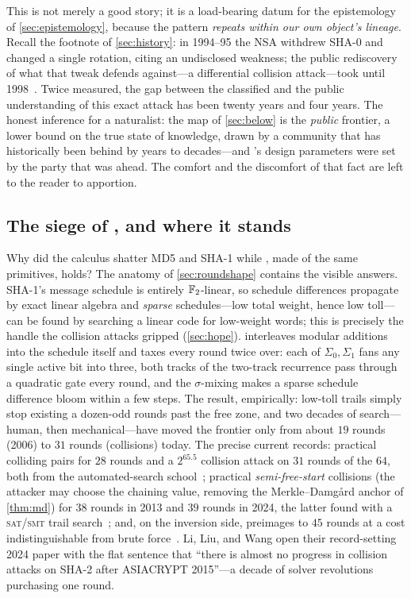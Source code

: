 This is not merely a good story; it is a load-bearing datum for the
epistemology of \cref{sec:epistemology}, because the pattern
\emph{repeats within our own object's lineage}. Recall the footnote of
\cref{sec:history}: in 1994--95 the NSA withdrew SHA-0 and changed a
single rotation, citing an undisclosed weakness; the public rediscovery
of what that tweak defends against---a differential collision
attack---took until 1998~\citep{ChabaudJoux1998}. Twice measured, the
gap between the classified and the public understanding of this exact
attack has been twenty years and four years. The honest inference for a
naturalist: the map of \cref{sec:below} is the \emph{public} frontier,
a lower bound on the true state of knowledge, drawn by a community that
has historically been behind by years to decades---and \SHA{}'s design
parameters were set by the party that was ahead. The comfort and the
discomfort of that fact are left to the reader to apportion.

\subsection{The siege of \SHA{}, and where it stands}\label{sec:siege}

Why did the calculus shatter MD5 and SHA-1 while \SHA{}, made of the
same primitives, holds? The anatomy of \cref{sec:roundshape} contains
the visible answers. SHA-1's message schedule is entirely
$\mathbb{F}_2$-linear, so schedule differences propagate by exact linear
algebra and \emph{sparse} schedules---low total weight, hence low
toll---can be found by searching a linear code for low-weight words;
this is precisely the handle the collision attacks
gripped (\cref{sec:hope}). \SHA{} interleaves modular additions into
the schedule itself and taxes every round twice over: each of
$\Sigma_0, \Sigma_1$ fans any single active bit into three, both tracks
of the two-track recurrence pass through a quadratic gate every round,
and the $\sigma$-mixing makes a sparse schedule difference bloom
within a few steps. The result, empirically: low-toll trails simply
stop existing a dozen-odd rounds past the free zone, and two decades of
search---human, then mechanical---have moved the frontier only from
about $19$ rounds (2006) to $31$ rounds (collisions) today. The precise
current records: practical colliding pairs for $28$ rounds and a
$2^{65.5}$ collision attack on $31$ rounds of the $64$, both from the
automated-search school~\citep{MendelNadSchlaffer2013}; practical
\emph{semi-free-start} collisions (the attacker may choose the chaining
value, removing the Merkle--Damg{\aa}rd anchor of \cref{thm:md}) for
$38$ rounds in 2013 and $39$ rounds in 2024, the latter found with a
\textsc{sat}/\textsc{smt} trail search~\citep{LiLiuWang2024,
AlamgirNejatiBright2024}; and, on the inversion side, preimages to $45$
rounds at a cost indistinguishable from brute
force~\citep{KRS2012}. Li, Liu, and Wang open their record-setting 2024
paper with the flat sentence that ``there is almost no progress in
collision attacks on SHA-2 after ASIACRYPT 2015''---a decade of solver
revolutions purchasing one round.

